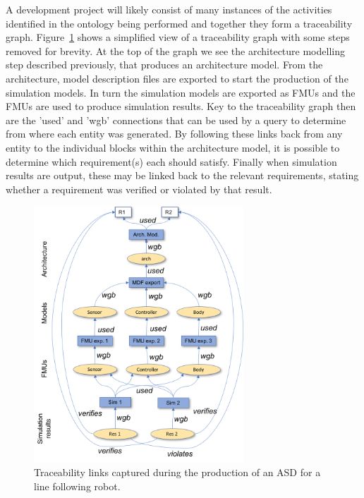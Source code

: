 
A development project will likely consist of many instances of the activities identified in the ontology being performed and together they form a traceability graph.  Figure~\ref{fig:traceability:abstractTraceFlow} shows a simplified view of a traceability graph with some steps removed for brevity.  At the top of the graph we see the architecture modelling step described previously, that produces an architecture model.  From the architecture, model description files are exported to start the production of the simulation models.  In turn the simulation models are exported as FMUs and the FMUs are used to produce simulation results.  Key to the traceability graph then are the 'used' and 'wgb' connections that can be used by a query to determine from where each entity was generated.  By following these links back from any entity to the individual blocks within the architecture model, it is possible to determine which requirement(s) each should satisfy.  Finally when simulation results are output, these may be linked back to the relevant requirements, stating whether a requirement was verified or violated by that result.



\begin{figure}[htbp]
	\centering
	\includegraphics[width=0.7\textwidth]{figures/Traceability/abstractTraceFlow}
\caption{Traceability links captured during the production of an ASD for a line following robot.}\label{fig:traceability:abstractTraceFlow}
\end{figure}


